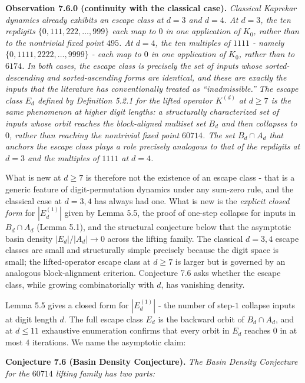 \documentclass[11pt,letterpaper]{article}
\theoremstyle{paperstyle}
\theoremstyle{paperstyledef}
\theoremstyle{paperstylerem}
\begin{document}
\textbf{Observation 7.6.0 (continuity with the classical case).}
\emph{Classical Kaprekar dynamics already exhibits an escape class at
\(d = 3\) and \(d = 4\). At \(d = 3\), the ten repdigits
\(\{0, 111, 222, \ldots, 999\}\) each map to \(0\) in one application of
\(K_0\), rather than to the nontrivial fixed point \(495\). At
\(d = 4\), the ten multiples of \(1111\) - namely
\(\{0, 1111, 2222, \ldots, 9999\}\) - each map to \(0\) in one
application of \(K_0\), rather than to \(6174\). In both cases, the
escape class is precisely the set of inputs whose sorted-descending and
sorted-ascending forms are identical, and these are exactly the inputs
that the literature has conventionally treated as ``inadmissible.'' The
escape class \(E_d\) defined by Definition 5.2.1 for the lifted operator
\(K^{(d)}\) at \(d \geq 7\) is the same phenomenon at higher digit
lengths: a structurally characterized set of inputs whose orbit reaches
the block-aligned multiset set \(B_d\) and then collapses to \(0\),
rather than reaching the nontrivial fixed point \(60714\). The set
\(B_d \cap A_d\) that anchors the escape class plays a role precisely
analogous to that of the repdigits at \(d = 3\) and the multiples of
\(1111\) at \(d = 4\).}

What is new at \(d \geq 7\) is therefore not the existence of an escape
class - that is a generic feature of digit-permutation dynamics under
any sum-zero rule, and the classical case at \(d = 3, 4\) has always had
one. What is new is the \emph{explicit closed form} for \(|E_d^{(1)}|\)
given by Lemma 5.5, the proof of one-step collapse for inputs in
\(B_d \cap A_d\) (Lemma 5.1), and the structural conjecture below that
the asymptotic basin density \(|E_d|/|A_d| \to 0\) across the lifting
family. The classical \(d = 3, 4\) escape classes are small and
structurally simple precisely because the digit space is small; the
lifted-operator escape class at \(d \geq 7\) is larger but is governed
by an analogous block-alignment criterion. Conjecture 7.6 asks whether
the escape class, while growing combinatorially with \(d\), has
vanishing density.

Lemma 5.5 gives a closed form for \(|E_d^{(1)}|\) - the number of
step-\(1\) collapse inputs at digit length \(d\). The full escape class
\(E_d\) is the backward orbit of \(B_d \cap A_d\), and at \(d \leq 11\)
exhaustive enumeration confirms that every orbit in \(E_d\) reaches
\(0\) in at most \(4\) iterations. We name the asymptotic claim:

\textbf{Conjecture 7.6 (Basin Density Conjecture).} \emph{The Basin
Density Conjecture for the \(60714\) lifting family has two parts:}
\end{document}
